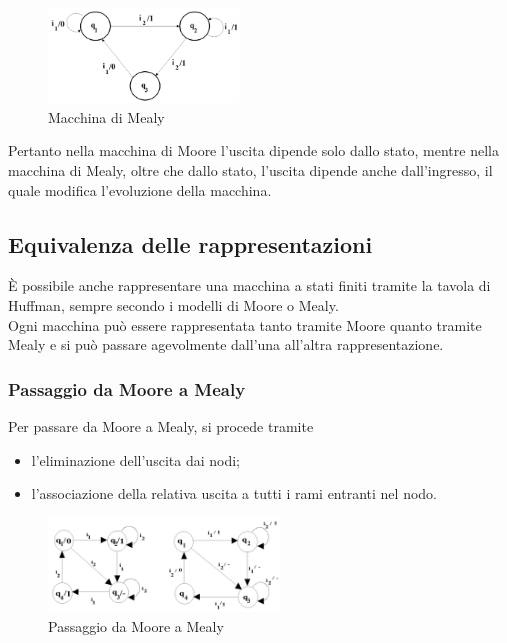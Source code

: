 \documentclass[a4paper]{extarticle}
\begin{document}
\begin{figure}[H]
    \centering
    \includegraphics[width=0.45\textwidth]{macchina-mealy.png}
    \caption{Macchina di Mealy}
    \label{fig:macchina_mealy}
\end{figure}

\vspace{1em}
\noindent
Pertanto nella macchina di Moore l'uscita dipende solo dallo stato, mentre nella macchina di Mealy, oltre che dallo stato, l'uscita dipende anche dall'ingresso, il quale modifica l'evoluzione della macchina.

\vspace{1em}
\noindent
\subsection{Equivalenza delle rappresentazioni}
È possibile anche rappresentare una macchina a stati finiti tramite la tavola di Huffman, sempre secondo i modelli di Moore o Mealy.\\
Ogni macchina può essere rappresentata tanto tramite Moore quanto tramite Mealy e si può passare agevolmente dall'una all'altra rappresentazione.

\vspace{1em}
\noindent
\subsubsection{Passaggio da Moore a Mealy}
Per passare da Moore a Mealy, si procede tramite
\begin{itemize}
    \item l'eliminazione dell'uscita dai nodi;
    \item l'associazione della relativa uscita a tutti i rami entranti nel nodo.
\end{itemize}

\begin{figure}[H]
    \centering
    \includegraphics[width=0.55\textwidth]{passaggio-moore-mealy.png}
    \caption{Passaggio da Moore a Mealy}
    \label{fig:passaggio_moore_mealy}
\end{figure}
\end{document}
